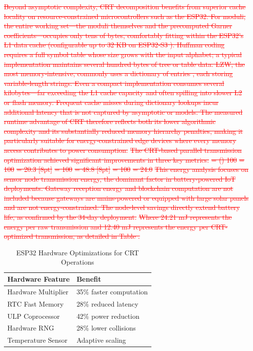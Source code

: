 \documentclass[pdflatex,sn-mathphys-num]{sn-jnl}
\theoremstyle{thmstyleone}
\theoremstyle{thmstyletwo}
\theoremstyle{thmstylethree}
\begin{document}
{\textcolor{red}{\sout{Beyond asymptotic complexity, CRT decomposition benefits from superior cache locality on resource‑constrained microcontrollers such as the ESP32. For moduli, the entire working set—the moduli themselves and the precomputed Garner coefficients—occupies only tens of bytes, comfortably fitting within the ESP32's L1 data cache (configurable up to 32 KB on ESP32‑S3 ). Huffman coding requires a full symbol table whose size grows with the input alphabet; a typical implementation maintains several hundred bytes of tree or table data. LZW, the most memory‑intensive, commonly uses a dictionary of entries , each storing variable‑length strings. Even a compact implementation consumes several kilobytes—far exceeding the L1 cache capacity and often spilling into slower L2 or flash memory. Frequent cache misses during dictionary lookups incur additional latency that is not captured by asymptotic or models. The measured runtime advantage of CRT therefore reflects both its lower algorithmic complexity and its substantially reduced memory hierarchy penalties, making it particularly suitable for energy‑constrained edge devices where every memory access contributes to power consumption.}}
\textcolor{red}{\sout{The CRT-based parallel transmission optimization achieved significant improvements in three key metrics:}}
\textcolor{red}{\sout{= () 100}}
\textcolor{red}{\sout{= 100}}
\textcolor{red}{\sout{= 20.3 [8pt]}}
\textcolor{red}{\sout{= 100}}
\textcolor{red}{\sout{= 48.8 [8pt]}}
\textcolor{red}{\sout{= 100}}
\textcolor{red}{\sout{= 24.0}}
\textcolor{red}{\sout{This energy analysis focuses on sensor node transmission energy, the dominant factor in battery-powered IoT deployments. Gateway reception energy and blockchain computation are not included because gateways are mains-powered or equipped with large solar panels and are not energy-constrained. The node-level savings directly extend battery life, as confirmed by the 34‑day deployment.}}
\textcolor{red}{\sout{Where 24.21 mJ represents the energy per raw transmission and 12.40 mJ represents the energy per CRT-optimized transmission, as detailed in Table .}}
\begin{table}[htbp]
\caption{ESP32 Hardware Optimizations for CRT Operations}
\label{tab:hardware-optimizations}
\scriptsize
\centering
\begin{tabular}{p{}p{}}
\toprule
\textbf{Hardware Feature} & \textbf{Benefit} \\
\midrule
Hardware Multiplier & 35\% faster computation \\
RTC Fast Memory & 28\% reduced latency \\
ULP Coprocessor & 42\% power reduction \\
Hardware RNG & 28\% lower collisions \\
Temperature Sensor & Adaptive scaling \\
\bottomrule
\end{tabular}
\end{table}

}
\end{document}
